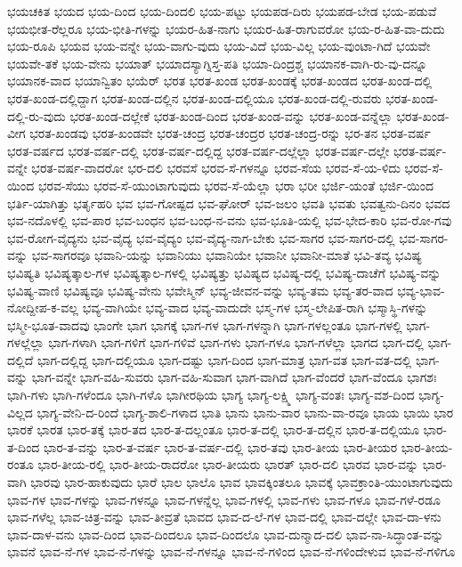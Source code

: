 {ಭಯಚಕಿತ
ಭಯದ
ಭಯ-ದಿಂದ
ಭಯ-ದಿಂದಲಿ
ಭಯ-ಪಟ್ಟು
ಭಯಪಡ-ದಿರು
ಭಯಪಡ-ಬೇಡ
ಭಯ-ಪಡುವೆ
ಭಯಭೀತ-ರೆಲ್ಲರೂ
ಭಯ-ಭೀತಿ-ಗಳನ್ನು
ಭಯರ-ಹಿತ-ನಾಗು
ಭಯರ-ಹಿತ-ರಾಗುವರೋ
ಭಯ-ರ-ಹಿತ-ವಾ-ದುದು
ಭಯ-ರೂಪಿ
ಭಯವ
ಭಯ-ವನ್ನೇ
ಭಯ-ವಾಗು-ವುದು
ಭಯ-ವಿದೆ
ಭಯ-ವಿಲ್ಲ
ಭಯ-ವುಂಟಾ-ಗಿದೆ
ಭಯವೇ
ಭಯವೇ-ತಕೆ
ಭಯ-ವೇನು
ಭಯಾತ್
ಭಯಾದಸ್ಯಾಗ್ನಿಸ್ತ-ಪತಿ
ಭಯಾ-ದಿಂದ್ರಶ್ಚ
ಭಯಾನಕ-ವಾಗಿ-ರು-ವು-ದನ್ನೂ
ಭಯಾನಕ-ವಾದ
ಭಯಾನ್ವಿತಂ
ಭಯೆರ್
ಭರತ
ಭರತ-ಖಂಡ
ಭರತ-ಖಂಡಕ್ಕೆ
ಭರತ-ಖಂಡದ
ಭರತ-ಖಂಡ-ದಲ್ಲಿ
ಭರತ-ಖಂಡ-ದಲ್ಲಿದ್ದಾಗ
ಭರತ-ಖಂಡ-ದಲ್ಲಿನ
ಭರತ-ಖಂಡ-ದಲ್ಲಿಯೂ
ಭರತ-ಖಂಡ-ದಲ್ಲಿ-ರುವರು
ಭರತ-ಖಂಡ-ದಲ್ಲಿ-ರು-ವುದು
ಭರತ-ಖಂಡ-ದಲ್ಲೇಕೆ
ಭರತ-ಖಂಡ-ದಿಂದ
ಭರತ-ಖಂಡ-ವನ್ನು
ಭರತ-ಖಂಡ-ವನ್ನೆಲ್ಲಾ
ಭರತ-ಖಂಡ-ವೀಗ
ಭರತ-ಖಂಡವು
ಭರತ-ಖಂಡವೇ
ಭರತ-ಚಂದ್ರ
ಭರತ-ಚಂದ್ರರ
ಭರತ-ಚಂದ್ರ-ರನ್ನು
ಭರ-ತನ
ಭರತ-ವರ್ಷ
ಭರತ-ವರ್ಷದ
ಭರತ-ವರ್ಷ-ದಲ್ಲಿ
ಭರತ-ವರ್ಷ-ದಲ್ಲಿದ್ದ
ಭರತ-ವರ್ಷ-ದಲ್ಲೆಲ್ಲಾ
ಭರತ-ವರ್ಷ-ದಲ್ಲೇ
ಭರತ-ವರ್ಷ-ವನ್ನೇ
ಭರತ-ವರ್ಷ-ವಾದರೋ
ಭರ-ದಲಿ
ಭರವಸೆ
ಭರವ-ಸೆ-ಗಳನ್ನೂ
ಭರವ-ಸೆಯ
ಭರವ-ಸೆ-ಯ-ಳಿದು
ಭರವ-ಸೆ-ಯಿಂದ
ಭರವ-ಸೆಯು
ಭರವ-ಸೆ-ಯುಂಟಾಗುವುದು
ಭರವ-ಸೆ-ಯೆಲ್ಲಾ
ಭರಾ
ಭರೀ
ಭರ್ಜಿ-ಯಂತೆ
ಭರ್ಜಿ-ಯಿಂದ
ಭರ್ತಿ-ಯಾಗಿತ್ತು
ಭರ್ತೃಹರಿ
ಭವ
ಭವ-ಗೋಷ್ಪದ
ಭವ-ಘೋರ್
ಭವ-ಜಲಂ
ಭವತಿ
ಭವತು
ಭವತ್ವನು-ದಿನಂ
ಭವದ
ಭವ-ನದೊಳಲ್ಲಿ
ಭವ-ಪಾರ
ಭವ-ಬಂಧನ
ಭವ-ಬಂಧ-ನ-ವನು
ಭವ-ಭೂತಿ-ಯಲ್ಲಿ
ಭವ-ಭೇದ-ಕಾರಿ
ಭವ-ರೋ-ಗವು
ಭವ-ರೋಗ-ವೈದ್ಯನು
ಭವ-ವೈದ್ಯ
ಭವ-ವೈದ್ಯಂ
ಭವ-ವೈದ್ಯ-ನಾಗ-ಬೇಕು
ಭವ-ಸಾಗರ
ಭವ-ಸಾಗರ-ದಲ್ಲಿ
ಭವ-ಸಾಗರ-ವನ್ನು
ಭವ-ಸಾಗರವೂ
ಭವಾನಿ-ಯನ್ನು
ಭವಾನಿಯು
ಭವಾನಿಯೇ
ಭವಾನೀ
ಭವಾನೀ-ಮಾತೆ
ಭವಿ-ತವ್ಯ
ಭವಿಷ್ಯ
ಭವಿಷ್ಯತಿ
ಭವಿಷ್ಯತ್ಕಾಲ-ಗಳ
ಭವಿಷ್ಯತ್ಕಾಲ-ಗಳಲ್ಲಿ
ಭವಿಷ್ಯತ್ತು
ಭವಿಷ್ಯದ
ಭವಿಷ್ಯ-ದಲ್ಲಿ
ಭವಿಷ್ಯ-ದಾಚೆಗೆ
ಭವಿಷ್ಯ-ವನ್ನು
ಭವಿಷ್ಯ-ವಾಣಿ
ಭವಿಷ್ಯವೂ
ಭವಿಷ್ಯ-ವೇನು
ಭವೇಸ್ಮಿನ್
ಭವ್ಯ-ಜೀವನ-ವನ್ನು
ಭವ್ಯ-ತಮ
ಭವ್ಯ-ತರ-ವಾದ
ಭವ್ಯ-ಭಾವ-ನೋದ್ದೀಪ-ಕ-ವಲ್ಲ
ಭವ್ಯ-ವಾಗಿಯೇ
ಭವ್ಯ-ವಾದ
ಭವ್ಯ-ವಾದುದೇ
ಭಸ್ಮ-ಗಳ
ಭಸ್ಮ-ಲೇಪಿತ-ರಾಗಿ
ಭಸ್ಮಾಸ್ಥಿ-ಗಳನ್ನು
ಭಸ್ಮೀ-ಭೂತ-ವಾದವು
ಭಾಂಗೇ
ಭಾಗ
ಭಾಗಕ್ಕೆ
ಭಾಗ-ಗಳ
ಭಾಗ-ಗಳನ್ನಾಗಿ
ಭಾಗ-ಗಳಲ್ಲಂತೂ
ಭಾಗ-ಗಳಲ್ಲಿ
ಭಾಗ-ಗಳಲ್ಲೆಲ್ಲಾ
ಭಾಗ-ಗಳಾಗಿ
ಭಾಗ-ಗಳಿಗೆ
ಭಾಗ-ಗಳಿವೆ
ಭಾಗ-ಗಳು
ಭಾಗ-ಗಳೂ
ಭಾಗ-ಗಳೆಲ್ಲಾ
ಭಾಗದ
ಭಾಗ-ದಲ್ಲಿ
ಭಾಗ-ದಲ್ಲಿದೆ
ಭಾಗ-ದಲ್ಲಿದ್ದ
ಭಾಗ-ದಲ್ಲಿಯೂ
ಭಾಗ-ದಷ್ಟು
ಭಾಗ-ದಿಂದ
ಭಾಗ-ಮಾತ್ರ
ಭಾಗ-ವತ
ಭಾಗ-ವತ-ದಲ್ಲಿ
ಭಾಗ-ವನ್ನು
ಭಾಗ-ವನ್ನೇ
ಭಾಗ-ವಹಿ-ಸುವರು
ಭಾಗ-ವಹಿ-ಸುವಾಗ
ಭಾಗ-ವಾಗಿದೆ
ಭಾಗ-ವೆಂದರೆ
ಭಾಗ-ವೆಂದೂ
ಭಾಗಶಃ
ಭಾಗಿ-ಗಳು
ಭಾಗಿ-ಗಳೆಂದೂ
ಭಾಗಿ-ಗಳೊ
ಭಾಗೀರಥಿಯ
ಭಾಗ್ಯ
ಭಾಗ್ಯ-ಲಕ್ಷ್ಮಿ
ಭಾಗ್ಯ-ವಂತಃ
ಭಾಗ್ಯ-ವಶ-ದಿಂದ
ಭಾಗ್ಯ-ವಿಲ್ಲದ
ಭಾಗ್ಯ-ವೇನಿ-ದ-ರಿಂದೆ
ಭಾಗ್ಯ-ಶಾಲಿ-ಗಳಾದ
ಭಾತಿ
ಭಾನು
ಭಾನು-ವಾರ
ಭಾನು-ವಾ-ರವೂ
ಭಾಯ
ಭಾಯಿ
ಭಾರ
ಭಾರಕೆ
ಭಾರತ
ಭಾರ-ತಕ್ಕೆ
ಭಾರ-ತದ
ಭಾರ-ತ-ದಲ್ಲಂತೂ
ಭಾರ-ತ-ದಲ್ಲಿ
ಭಾರ-ತ-ದಲ್ಲಿನ
ಭಾರ-ತ-ದಲ್ಲಿಯೂ
ಭಾರ-ತ-ದಿಂದ
ಭಾರ-ತ-ವನ್ನು
ಭಾರ-ತ-ವರ್ಷ
ಭಾರ-ತ-ವರ್ಷ-ದಲ್ಲಿ
ಭಾರ-ತವು
ಭಾರ-ತೀಯ
ಭಾರ-ತೀಯರ
ಭಾರ-ತೀಯ-ರಂತೂ
ಭಾರ-ತೀಯ-ರಲ್ಲಿ
ಭಾರ-ತೀಯ-ರಾದರೋ
ಭಾರ-ತೀಯರು
ಭಾರತ್
ಭಾರ-ದಲಿ
ಭಾರವ
ಭಾರ-ವನ್ನು
ಭಾರ-ವಾಗಿ
ಭಾರವು
ಭಾರ-ಹಾಕುವುದು
ಭಾರೆ
ಭಾಲ
ಭಾಲೊ
ಭಾವ
ಭಾವಕ್ಕಿಂತಲೂ
ಭಾವಕ್ಕೆ
ಭಾವಕ್ರಾಂತಿ-ಯುಂಟಾಗುವುದು
ಭಾವ-ಗಳ
ಭಾವ-ಗಳನ್ನು
ಭಾವ-ಗಳನ್ನೂ
ಭಾವ-ಗಳನ್ನೆಲ್ಲ
ಭಾವ-ಗಳಲ್ಲಿ
ಭಾವ-ಗಳು
ಭಾವ-ಗಳೂ
ಭಾವ-ಗಳೆ-ರಡೂ
ಭಾವ-ಗಳೆಲ್ಲ
ಭಾವ-ಚಿತ್ರ-ವನ್ನು
ಭಾವ-ತೀವ್ರತೆ
ಭಾವದ
ಭಾವ-ದ-ಲೆ-ಗಳ
ಭಾವ-ದಲ್ಲಿ
ಭಾವ-ದಲ್ಲೇ
ಭಾವ-ದಾ-ಳನು
ಭಾವ-ದಾಳ-ವನು
ಭಾವ-ದಿಂದ
ಭಾವ-ದಿಂದಲೂ
ಭಾವ-ದಿಂದಲೊ
ಭಾವ-ದುನ್ಮಾದ-ದಲಿ
ಭಾವ-ನಾ-ಸಿದ್ಧಾಂತ-ವನ್ನು
ಭಾವನೆ
ಭಾವ-ನೆ-ಗಳ
ಭಾವ-ನೆ-ಗಳನ್ನು
ಭಾವ-ನೆ-ಗಳನ್ನೂ
ಭಾವ-ನೆ-ಗಳಿಂದ
ಭಾವ-ನೆ-ಗಳಿಂದೇಳುವ
ಭಾವ-ನೆ-ಗಳಿಗೂ
}
